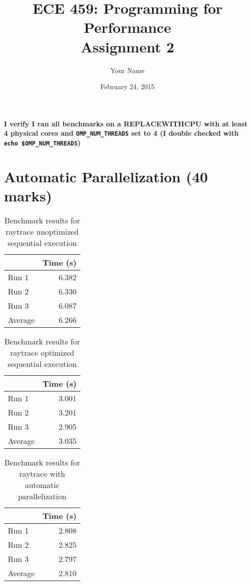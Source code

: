 \documentclass[12pt]{article}
\title{ECE 459: Programming for Performance\\Assignment 2}
\author{Your Name}
\date{February 24, 2015}
\begin{document}
\maketitle

{\bf I verify I ran all benchmarks on a REPLACEWITHCPU with at least 4 physical cores and
{\tt OMP\_NUM\_THREADS} set to 4 (I double checked with
{\tt echo \$OMP\_NUM\_THREADS})}

\section*{Automatic Parallelization (40 marks)}

\begin{table}[H]
  \centering
  \begin{tabular}{lr}
    & {\bf Time (s)} \\
    \hline
    Run 1 & 6.382 \\
    Run 2 & 6.330 \\
    Run 3 & 6.087 \\
    \hline
    Average & 6.266 \\
  \end{tabular}
  \caption{Benchmark results for raytrace unoptimized sequential execution}
  \label{tbl-raytrace-unopt-sequential}
\end{table}

\begin{table}[H]
  \centering
  \begin{tabular}{lr}
    & {\bf Time (s)} \\
    \hline
    Run 1 & 3.001 \\
    Run 2 & 3.201 \\
    Run 3 & 2.905 \\
    \hline
    Average & 3.035 \\
  \end{tabular}
  \caption{Benchmark results for raytrace optimized sequential execution}
  \label{tbl-raytrace-opt-sequential}
\end{table}

\begin{table}[H]
  \centering
  \begin{tabular}{lr}
    & {\bf Time (s)} \\
    \hline
    Run 1 & 2.808 \\
    Run 2 & 2.825 \\
    Run 3 & 2.797 \\
    \hline
    Average & 2.810 \\
  \end{tabular}
  \caption{Benchmark results for raytrace with automatic parallelization}
  \label{tbl-raytrace-automatic}
\end{table}
\end{document}
